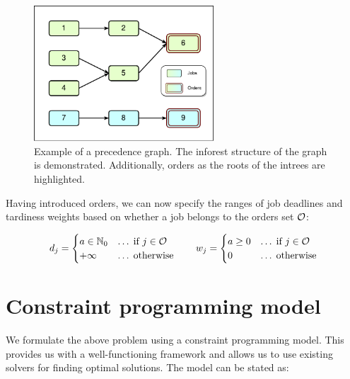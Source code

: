 \begin{figure}[t]
    \centering
    \includegraphics[width=0.6\textwidth]{img/Inforest.pdf}
    \caption{
        Example of a precedence graph.
        The inforest structure of the graph is demonstrated.
        Additionally, orders as the roots of the intrees are highlighted.}
    \label{fig:inforest}
\end{figure}

Having introduced orders, we can now specify the ranges of job deadlines and tardiness weights
based on whether a job belongs to the orders set $\mathcal{O}$:

$$
d_{j} = \begin{cases}
    a \in \mathbb{N}_0  &\dots\;   \text{if $j \in \mathcal{O}$} \\
    +\infty       &\dots\;   \text{otherwise}
\end{cases}
\qquad
w_{j} = \begin{cases}
    a \geq 0  &\dots\;   \text{if $j     \in \mathcal{O}$} \\
    0         &\dots\;   \text{otherwise}
\end{cases}
$$

\section{Constraint programming model} \label{sec:problem-statement/constraint-programming-model}

We formulate the above problem using a constraint programming model.
This provides us with a well-functioning framework
and allows us to use existing solvers for finding optimal solutions.
The model can be stated as:

